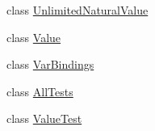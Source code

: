 \begin{DoxyCompactItemize}
\item 
class \hyperlink{classorg_1_1tzi_1_1use_1_1uml_1_1ocl_1_1value_1_1_unlimited_natural_value}{Unlimited\-Natural\-Value}
\item 
class \hyperlink{classorg_1_1tzi_1_1use_1_1uml_1_1ocl_1_1value_1_1_value}{Value}
\item 
class \hyperlink{classorg_1_1tzi_1_1use_1_1uml_1_1ocl_1_1value_1_1_var_bindings}{Var\-Bindings}
\item 
class \hyperlink{classorg_1_1tzi_1_1use_1_1uml_1_1ocl_1_1value_1_1_all_tests}{All\-Tests}
\item 
class \hyperlink{classorg_1_1tzi_1_1use_1_1uml_1_1ocl_1_1value_1_1_value_test}{Value\-Test}
\end{DoxyCompactItemize}
